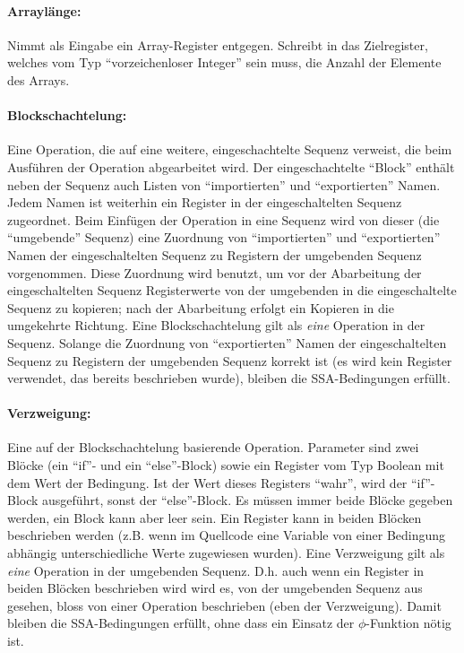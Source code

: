 \documentclass[twoside,a4paper,fleqn,12pt]{article}
\begin{document}
\paragraph{Arraylänge:} Nimmt als Eingabe ein Array-Register entgegen. Schreibt in das Zielregister, welches vom Typ "`vorzeichenloser Integer"' sein muss,
die Anzahl der Elemente des Arrays.

\paragraph{Blockschachtelung:} Eine Operation, die auf eine weitere, eingeschachtelte Sequenz verweist, die beim Ausführen der Operation abgearbeitet wird.
Der eingeschachtelte "`Block"' enthält neben der Sequenz auch Listen von "`importierten"' und "`exportierten"' Namen.
Jedem Namen ist weiterhin ein Register in der eingeschaltelten Sequenz zugeordnet.
Beim Einfügen der Operation in eine Sequenz wird von dieser (die "`umgebende"' Sequenz) eine Zuordnung von "`importierten"' und "`exportierten"' Namen der
eingeschaltelten Sequenz zu Registern der umgebenden Sequenz vorgenommen. 
Diese Zuordnung wird benutzt, um vor der Abarbeitung der eingeschaltelten Sequenz Registerwerte von der umgebenden in die eingeschaltelte Sequenz zu kopieren;
nach der Abarbeitung erfolgt ein Kopieren in die umgekehrte Richtung.
Eine Blockschachtelung gilt als \emph{eine} Operation in der Sequenz. Solange die Zuordnung von "`exportierten"' Namen der
eingeschaltelten Sequenz zu Registern der umgebenden Sequenz korrekt ist (es wird kein Register verwendet, das bereits beschrieben wurde), bleiben die SSA-Bedingungen erfüllt.

\paragraph{Verzweigung:} Eine auf der Blockschachtelung basierende Operation. Parameter sind zwei Blöcke (ein ``if''- und ein ``else''-Block) sowie ein Register vom
Typ Boolean mit dem Wert der Bedingung. Ist der Wert dieses Registers "`wahr"', wird der ``if''-Block ausgeführt, sonst der ``else''-Block. Es müssen immer beide Blöcke
gegeben werden, ein Block kann aber leer sein.
Ein Register kann in beiden Blöcken beschrieben werden (z.B. wenn im Quellcode eine Variable von einer Bedingung abhängig unterschiedliche Werte zugewiesen wurden).
Eine Verzweigung gilt als \emph{eine} Operation in der umgebenden Sequenz. D.h. auch wenn ein Register in beiden Blöcken beschrieben wird wird es,
von der umgebenden Sequenz aus gesehen, bloss von einer Operation beschrieben (eben der Verzweigung). Damit bleiben die SSA-Bedingungen erfüllt,
ohne dass ein Einsatz der $\phi$-Funktion nötig ist.
\end{document}

